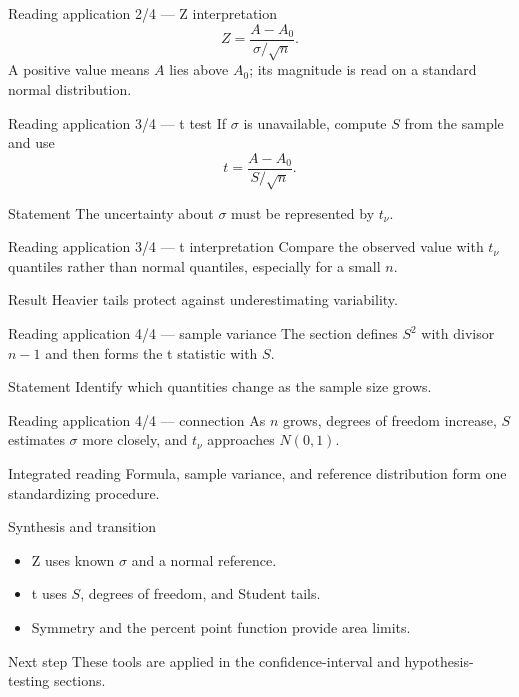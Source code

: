\documentclass[10pt,aspectratio=169]{beamer}
\begin{document}
\begin{frame}{Reading application 2/4 --- Z interpretation}
  \footnotesize
  \[
    Z=\frac{A-A_0}{\sigma/\sqrt n}.
  \]
  A positive value means $A$ lies above $A_0$; its magnitude is read on a
  standard normal distribution.
\end{frame}

\begin{frame}{Reading application 3/4 --- t test}
  \footnotesize
  If $\sigma$ is unavailable, compute $S$ from the sample and use
  \[
    t=\frac{A-A_0}{S/\sqrt n}.
  \]
  \begin{block}{Statement}
    The uncertainty about $\sigma$ must be represented by $t_\nu$.
  \end{block}
\end{frame}

\begin{frame}{Reading application 3/4 --- t interpretation}
  \footnotesize
  Compare the observed value with $t_\nu$ quantiles rather than normal
  quantiles, especially for a small $n$.
  \begin{alertblock}{Result}
    Heavier tails protect against underestimating variability.
  \end{alertblock}
\end{frame}

\begin{frame}{Reading application 4/4 --- sample variance}
  \footnotesize
  The section defines $S^2$ with divisor $n-1$ and then forms the t statistic
  with $S$.
  \begin{block}{Statement}
    Identify which quantities change as the sample size grows.
  \end{block}
\end{frame}

\begin{frame}{Reading application 4/4 --- connection}
  \footnotesize
  As $n$ grows, degrees of freedom increase, $S$ estimates $\sigma$ more closely,
  and $t_\nu$ approaches $N(0,1)$.
  \begin{exampleblock}{Integrated reading}
    Formula, sample variance, and reference distribution form one standardizing
    procedure.
  \end{exampleblock}
\end{frame}

\begin{frame}{Synthesis and transition}
  \footnotesize
  \begin{itemize}\itemsep=0.12cm
    \item Z uses known $\sigma$ and a normal reference.
    \item t uses $S$, degrees of freedom, and Student tails.
    \item Symmetry and the percent point function provide area limits.
  \end{itemize}
  \begin{alertblock}{Next step}
    These tools are applied in the confidence-interval and hypothesis-testing
    sections.
  \end{alertblock}
\end{frame}
\end{document}
